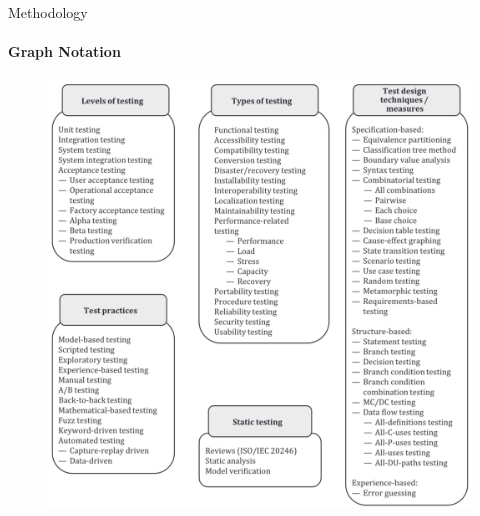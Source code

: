 \documentclass{beamer}
\begin{document}
\begin{frame}[t]{Methodology}
    \framesubtitle{Graph Notation}
    \begin{figure}
        \centering
        \includegraphics[height=0.65\textheight]{assets/images/test approach choices}
        \caption{\tiny \citep[Fig.~2]{IEEE2022}}
    \end{figure}
\end{frame}
\end{document}
